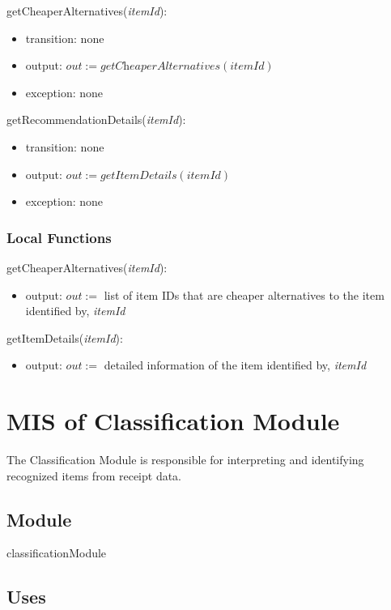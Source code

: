 \documentclass[12pt, titlepage]{article}
\begin{document}
\noindent getCheaperAlternatives(\textit{itemId}):
\begin{itemize}
  \item transition: none
  \item output: $out := \textit{getCheaperAlternatives}(\textit{itemId})$ 
  \item exception: none
\end{itemize}

\noindent getRecommendationDetails(\textit{itemId}):
\begin{itemize}
  \item transition: none
  \item output: $out := \textit{getItemDetails}(\textit{itemId})$
  \item exception: none
\end{itemize}

\subsubsection{Local Functions}

\noindent getCheaperAlternatives(\textit{itemId}):
\begin{itemize}
  \item output: $out :=$ list of item IDs that are cheaper alternatives to the item identified by, \textit{itemId}
\end{itemize}

\noindent getItemDetails(\textit{itemId}):
\begin{itemize}
  \item output: $out :=$ detailed information of the item identified by, \textit{itemId}
\end{itemize}

\newpage

\section{MIS of Classification Module} \label{mClassification}

The Classification Module is responsible for interpreting and identifying recognized items from receipt data.

\subsection{Module}

classificationModule

\subsection{Uses}
\end{document}
